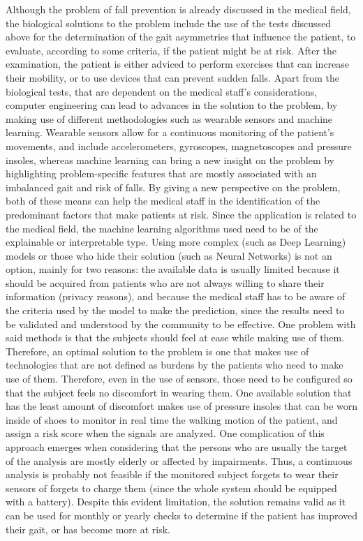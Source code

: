 Although the problem of fall prevention is already discussed in the medical field, the biological solutions to the problem include the use of the tests discussed above for the determination of the gait asymmetries 
that influence the patient, to evaluate, according to some criteria, if the patient might be at risk. After the examination, the patient is either adviced to perform exercises that can increase their mobility, or to use devices that can prevent sudden falls.
Apart from the biological tests, that are dependent on the medical staff's considerations, computer engineering can lead to advances in the solution to the problem, by making use of different methodologies such as wearable sensors and machine learning. 
Wearable sensors allow for a continuous monitoring of the patient's movements, and include accelerometers, gyroscopes, magnetoscopes and pressure insoles, whereas machine learning can bring a new insight on the problem by highlighting problem-specific features that are mostly associated with an imbalanced gait and risk of falls. By giving a new perspective on the problem, both of these means can help the medical staff in the identification of the predominant factors that make patients at risk.
Since the application is related to the medical field, the machine learning algorithms used need to be of the explainable or interpretable type. Using more complex (such as Deep Learning) models or those who hide their solution (such as Neural Networks) is not an option, mainly for two reasons:
the available data is usually limited because it should be acquired from patients who are not always willing to share their information (privacy reasons), and because the medical staff has to be aware of the criteria used by the model to make the prediction, since the results need to be validated and understood by the community to be effective.
One problem with said methods is that the subjects should feel at ease while making use of them. Therefore, an optimal solution to the problem is one that makes use of technologies that are not defined as burdens by the patients who need to make use of them. Therefore, even in the use of
sensors, those need to be configured so that the subject feels no discomfort in wearing them. One available solution that has the least amount of discomfort makes use of pressure insoles that can be worn inside of shoes to monitor in real time the walking motion of the patient, and assign a risk score
when the signals are analyzed. 
One complication of this approach emerges when considering that the persons who are usually the target of the analysis are mostly elderly or affected by impairments.
Thus, a continuous analysis is probably not feasible if the monitored subject forgets to wear their sensors of forgets to charge them (since the whole system should be equipped with a battery).
Despite this evident limitation, the solution remains valid as it can be used for monthly or yearly checks to determine if the patient has improved their gait, or has become more at risk.
